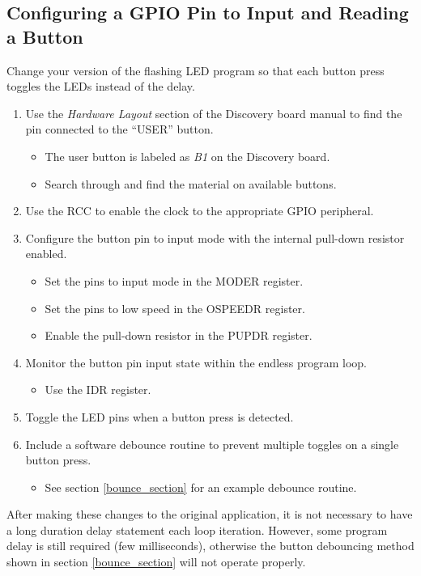 \documentclass[openany,11pt,fleqn]{book} %
\begin{document}
\subsection{Configuring a GPIO Pin to Input and Reading a Button}

Change your version of the flashing LED program so that each button press toggles the LEDs instead of the delay.

\begin{enumerate}
    \item Use the \textit{Hardware Layout} section of the Discovery board manual to find the pin connected to the ``USER'' button.
    \begin{itemize}
        \item The user button is labeled as \textit{B1} on the Discovery board.
        \item Search through and find the material on available buttons. 
    \end{itemize}
    \item Use the RCC to enable the clock to the appropriate GPIO peripheral.
    \item Configure the button pin to input mode with the internal pull-down resistor enabled.
    \begin{itemize}
        \item Set the pins to input mode in the MODER register. 
        \item Set the pins to low speed in the OSPEEDR register. 
        \item Enable the pull-down resistor in the PUPDR register. 
    \end{itemize}
    \item Monitor the button pin input state within the endless program loop.
    \begin{itemize}
        \item Use the IDR register.  
    \end{itemize}
    \item Toggle the LED pins when a button press is detected.
    \item Include a software debounce routine to prevent multiple toggles on a single button press.
    \begin{itemize}
        \item See section \ref{bounce_section} for an example debounce routine. 
    \end{itemize}
\end{enumerate}

After making these changes to the original application, it is not necessary to have a long duration delay statement each loop iteration. However, some program delay is still required (few milliseconds), otherwise the button debouncing method shown in section \ref{bounce_section} will not operate properly. 
\end{document}
